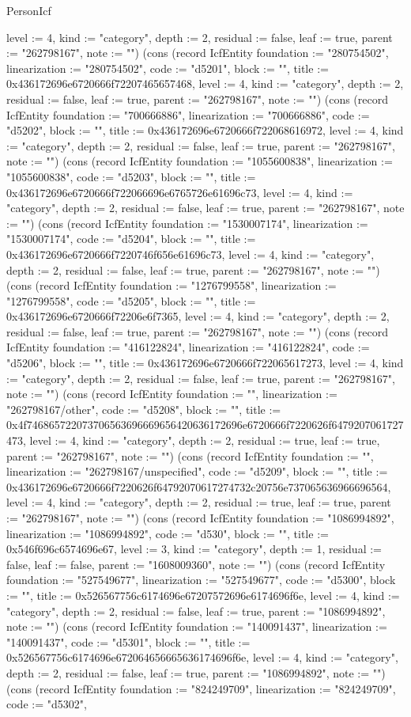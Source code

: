 \begin{lexlean}{PersonIcf}
\begin{semanticmodule}
{level := 4, kind := "category", depth := 2, residual := false, leaf := true, parent := "262798167", note := ""}) (cons (record IcfEntity {foundation := "280754502", linearization := "280754502", code := "d5201", block := "", title := 0x436172696e6720666f72207465657468, level := 4, kind := "category", depth := 2, residual := false, leaf := true, parent := "262798167", note := ""}) (cons (record IcfEntity {foundation := "700666886", linearization := "700666886", code := "d5202", block := "", title := 0x436172696e6720666f722068616972, level := 4, kind := "category", depth := 2, residual := false, leaf := true, parent := "262798167", note := ""}) (cons (record IcfEntity {foundation := "1055600838", linearization := "1055600838", code := "d5203", block := "", title := 0x436172696e6720666f722066696e6765726e61696c73, level := 4, kind := "category", depth := 2, residual := false, leaf := true, parent := "262798167", note := ""}) (cons (record IcfEntity {foundation := "1530007174", linearization := "1530007174", code := "d5204", block := "", title := 0x436172696e6720666f7220746f656e61696c73, level := 4, kind := "category", depth := 2, residual := false, leaf := true, parent := "262798167", note := ""}) (cons (record IcfEntity {foundation := "1276799558", linearization := "1276799558", code := "d5205", block := "", title := 0x436172696e6720666f72206e6f7365, level := 4, kind := "category", depth := 2, residual := false, leaf := true, parent := "262798167", note := ""}) (cons (record IcfEntity {foundation := "416122824", linearization := "416122824", code := "d5206", block := "", title := 0x436172696e6720666f722065617273, level := 4, kind := "category", depth := 2, residual := false, leaf := true, parent := "262798167", note := ""}) (cons (record IcfEntity {foundation := "", linearization := "262798167/other", code := "d5208", block := "", title := 0x4f746865722073706563696669656420636172696e6720666f7220626f6479207061727473, level := 4, kind := "category", depth := 2, residual := true, leaf := true, parent := "262798167", note := ""}) (cons (record IcfEntity {foundation := "", linearization := "262798167/unspecified", code := "d5209", block := "", title := 0x436172696e6720666f7220626f64792070617274732c20756e737065636966696564, level := 4, kind := "category", depth := 2, residual := true, leaf := true, parent := "262798167", note := ""}) (cons (record IcfEntity {foundation := "1086994892", linearization := "1086994892", code := "d530", block := "", title := 0x546f696c6574696e67, level := 3, kind := "category", depth := 1, residual := false, leaf := false, parent := "1608009360", note := ""}) (cons (record IcfEntity {foundation := "527549677", linearization := "527549677", code := "d5300", block := "", title := 0x526567756c6174696e67207572696e6174696f6e, level := 4, kind := "category", depth := 2, residual := false, leaf := true, parent := "1086994892", note := ""}) (cons (record IcfEntity {foundation := "140091437", linearization := "140091437", code := "d5301", block := "", title := 0x526567756c6174696e672064656665636174696f6e, level := 4, kind := "category", depth := 2, residual := false, leaf := true, parent := "1086994892", note := ""}) (cons (record IcfEntity {foundation := "824249709", linearization := "824249709", code := "d5302", }
\end{semanticmodule}
\end{lexlean}
